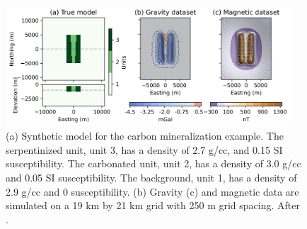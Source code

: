 \begin{figure}[!htb]
    \begin{center}
    \includegraphics[width=0.95\textwidth]{figures/joint-inversion-setup.png}
    \end{center}
\caption{
    (a) Synthetic model for the carbon mineralization example. The serpentinized unit, unit 3, has a density of 2.7 g/cc,  and 0.15 SI susceptibility.  The carbonated unit, unit 2, has a density of 3.0 g/cc and 0.05 SI susceptibility. The background, unit 1, has a density of 2.9 g/cc and 0 susceptibility. (b) Gravity (c) and magnetic data are simulated on a 19 km by 21 km grid with 250 m grid spacing. After \citep{capriotti_joint_2023}.
}
\label{fig:joint-inversion-setup}
\end{figure}
